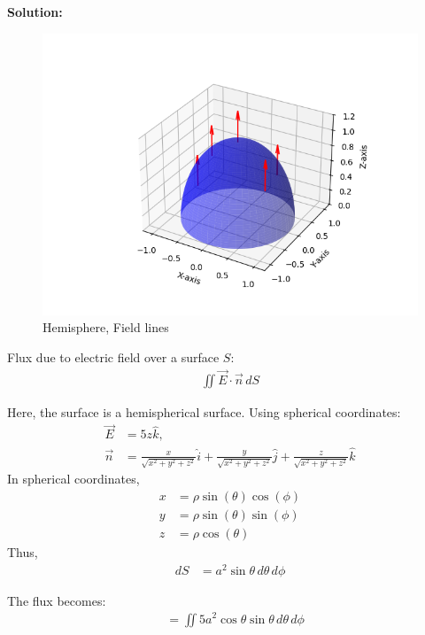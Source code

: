 \documentclass{article}
\begin{document}
\textbf{Solution:}\newline
\begin{figure}[h!]
   \centering
   \includegraphics[width=1\columnwidth]{figs/q3.png}
    \caption{Hemisphere, Field lines}
   \label{label}
\end{figure}

Flux due to electric field over a surface $S$:
\begin{align*}
\iint \vec{E} \cdot \vec{n} \, dS
\end{align*}

Here, the surface is a hemispherical surface. Using spherical coordinates:
\begin{align*}
\vec{E} &= 5z \hat{k}, \\
\vec{n} &= \frac{x}{\sqrt{x^2 + y^2 + z^2}} \hat{i} + \frac{y}{\sqrt{x^2 + y^2 + z^2}} \hat{j} + \frac{z}{\sqrt{x^2 + y^2 + z^2}} \hat{k}
\end{align*}
In spherical coordinates,
\begin{align*}
    x &= \rho \sin(\theta)  \cos(\phi)\\
    y &= \rho \sin(\theta)  \sin(\phi)\\
    z &= \rho \cos(\theta)
\end{align*}
Thus,
\begin{align*}
dS &= a^2 \sin{\theta} \, d\theta \, d\phi
\end{align*}

The flux becomes:
\begin{align*}
&= \iint 5a^2 \cos{\theta} \sin{\theta} \, d\theta \, d\phi
\end{align*}
\end{document}

